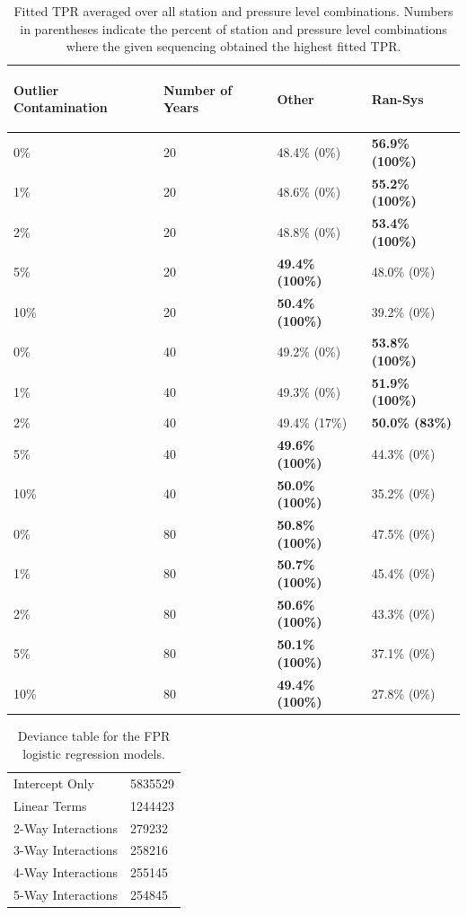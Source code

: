 \documentclass[12pt]{article}
\begin{document}
\begin{table}[ht]
	\centering
	\begin{tabular}{llll}
  		\hline
		\begin{sideways} Outlier Contamination \end{sideways} & \begin{sideways} Number of Years \end{sideways} & \begin{sideways} Other \end{sideways} & \begin{sideways} Ran-Sys \end{sideways} \\ 
 		\hline
		0\% & 20 & 48.4\% (0\%) & \textbf{56.9\% (100\%)} \\ 
		1\% & 20 & 48.6\% (0\%) & \textbf{55.2\% (100\%)} \\ 
		2\% & 20 & 48.8\% (0\%) & \textbf{53.4\% (100\%)} \\ 
		5\% & 20 & \textbf{49.4\% (100\%)} & 48.0\% (0\%) \\ 
		10\% & 20 & \textbf{50.4\% (100\%)} & 39.2\% (0\%) \\ 
		0\% & 40 & 49.2\% (0\%) & \textbf{53.8\% (100\%)} \\ 
		1\% & 40 & 49.3\% (0\%) & \textbf{51.9\% (100\%)} \\ 
		2\% & 40 & 49.4\% (17\%) & \textbf{50.0\% (83\%)} \\ 
		5\% & 40 & \textbf{49.6\% (100\%)} & 44.3\% (0\%) \\ 
		10\% & 40 & \textbf{50.0\% (100\%)} & 35.2\% (0\%) \\ 
		0\% & 80 & \textbf{50.8\% (100\%)} & 47.5\% (0\%) \\ 
		1\% & 80 & \textbf{50.7\% (100\%)} & 45.4\% (0\%) \\ 
		2\% & 80 & \textbf{50.6\% (100\%)} & 43.3\% (0\%) \\ 
		5\% & 80 & \textbf{50.1\% (100\%)} & 37.1\% (0\%) \\ 
		10\% & 80 & \textbf{49.4\% (100\%)} & 27.8\% (0\%) \\ 
		\hline
	\end{tabular}
	\caption{Fitted TPR averaged over all station and pressure level combinations.  Numbers in parentheses indicate the percent of station and pressure level combinations where the given sequencing obtained the highest fitted TPR.}
	\label{tab:fitTPR}
\end{table}

\begin{table}[ht]
\centering
\begin{tabular}{|ll|}
  \hline
  \hline
Intercept Only & 5835529 \\ 
  Linear Terms & 1244423 \\ 
  2-Way Interactions & 279232 \\ 
  3-Way Interactions & 258216 \\ 
  4-Way Interactions & 255145 \\ 
  5-Way Interactions & 254845 \\ 
   \hline
\end{tabular}
\caption{Deviance table for the FPR logistic regression models.}
\label{tab:devFPR}
\end{table}
\end{document}
